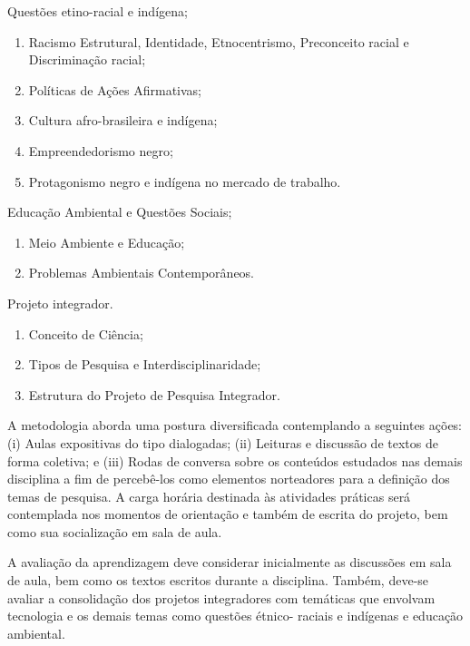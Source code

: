 \begin{pud}
\begin{description}[itemsep=0em]
        \item[UNIDADE II:] Questões etino-racial e indígena;
	         \begin{enumerate}[itemsep=0em, topsep=0em]
				\item Racismo Estrutural, Identidade, Etnocentrismo, Preconceito racial e Discriminação racial;
                \item Políticas de Ações Afirmativas;
                \item Cultura afro-brasileira e indígena;
                \item Empreendedorismo negro;
                \item Protagonismo negro e indígena no mercado de trabalho.
            \end{enumerate}
            
         \item[UNIDADE III:]  Educação Ambiental e Questões Sociais;
	         \begin{enumerate}[itemsep=0em, topsep=0em]
				\item Meio Ambiente e Educação;
				\item Problemas Ambientais Contemporâneos.       
            \end{enumerate}
            
         \item[UNIDADE IV:] Projeto integrador.
	         \begin{enumerate}[itemsep=0em, topsep=0em]
                \item Conceito de Ciência;
                \item Tipos de Pesquisa e Interdisciplinaridade;
                \item Estrutura do Projeto de Pesquisa Integrador.
            \end{enumerate}
	\end{description}
	
	
	\metodologia
	A metodologia aborda uma postura diversificada contemplando a seguintes ações: (i) Aulas expositivas do tipo dialogadas; (ii) Leituras e discussão de textos de forma coletiva; e (iii) Rodas de conversa sobre os conteúdos estudados nas demais disciplina a fim de percebê-los como elementos norteadores para a definição dos temas de pesquisa.
	A carga horária destinada às atividades práticas será contemplada nos momentos de orientação e também de escrita do projeto, bem como sua socialização em sala de aula.


	\avaliacao
	A avaliação da aprendizagem deve considerar inicialmente as discussões em sala de aula, bem como os textos escritos durante a disciplina. Também, deve-se avaliar a consolidação dos projetos integradores com temáticas que envolvam tecnologia e os demais temas como questões étnico- raciais e indígenas e educação ambiental.
	\naopresencial
	


\end{pud}
